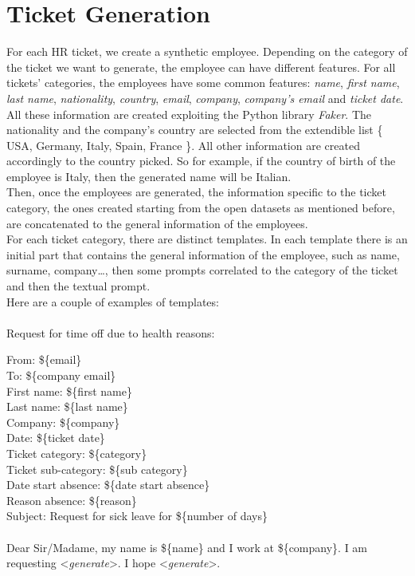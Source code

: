 \section{Ticket Generation}
For each HR ticket, we create a synthetic employee. Depending on the category of the ticket we want to generate, the employee can have different features. For all tickets' categories, the employees have some common features: \textit{name}, \textit{first name}, \textit{last name}, \textit{nationality}, \textit{country}, \textit{email}, \textit{company}, \textit{company's email} and \textit{ticket date}.\\
All these information are created exploiting the Python library \textit{Faker}\cite{Faraglia_Faker}. The nationality and the company's country are selected from the extendible list \{ USA, Germany, Italy, Spain, France \}. All other information are created accordingly to the country picked. So for example, if the country of birth of the employee is Italy, then the generated name will be Italian. \\
Then, once the employees are generated, the information specific to the ticket category, the ones created starting from the open datasets as mentioned before, are concatenated to the general information of the employees. \\
For each ticket category, there are distinct templates. In each template there is an initial part that contains the general information of the employee, such as name, surname, company\dots, then some prompts correlated to the category of the ticket and then the textual prompt. \\
Here are a couple of examples of templates:\\ \\
Request for time off due to health reasons:
\begin{adjustwidth}{1cm}{}
From: \$\{email\} \\
To: \$\{company email\} \\
First name: \$\{first name\}\\
Last name: \$\{last name\}\\
Company: \$\{company\}\\
Date: \$\{ticket date\}\\
Ticket category: \$\{category\}\\
Ticket sub-category: \$\{sub category\} \\
Date start absence: \$\{date start absence\} \\
Reason absence: \$\{reason\} \\ 
Subject: Request for sick leave for \$\{number of days\} \\ 
\\
Dear Sir/Madame, my name is \$\{name\} and I work at \$\{company\}. I am requesting \textless \textit{generate}\textgreater. I hope \textless \textit{generate}\textgreater. \\ \\

\end{adjustwidth}
